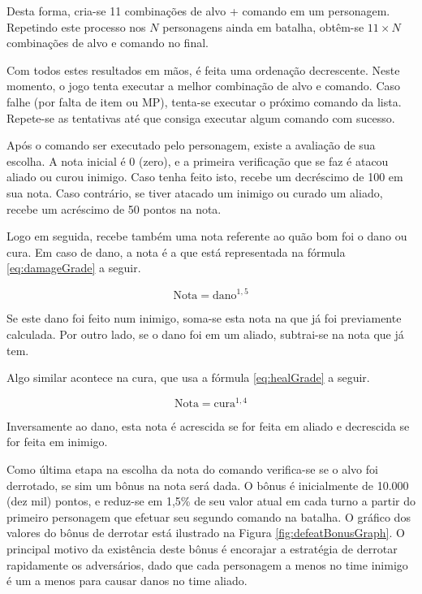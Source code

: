 \documentclass[12pt,a4paper]{article}
\begin{document}
	\vspace{3mm}
	
	Desta forma, cria-se 11 combinações de alvo + comando em um personagem.
	Repetindo este processo nos $N$ personagens ainda em batalha,
	obtêm-se $11 \times N$ combinações de alvo e comando no final.
	
	Com todos estes resultados em mãos,
	é feita uma ordenação decrescente.
	Neste momento,
	o jogo tenta executar a melhor combinação de alvo e comando.
	Caso falhe (por falta de item ou MP),
	tenta-se executar o próximo comando da lista.
	Repete-se as tentativas até que consiga executar algum comando com sucesso.
	
	Após o comando ser executado pelo personagem,
	existe a avaliação de sua escolha.
	A nota inicial é 0 (zero),
	e a primeira verificação que se faz é atacou aliado ou curou inimigo.
	Caso tenha feito isto,
	recebe um decréscimo de 100 em sua nota.
	Caso contrário,
	se tiver atacado um inimigo ou curado um aliado,
	recebe um acréscimo de 50 pontos na nota.
	
	Logo em seguida,
	recebe também uma nota referente ao quão bom foi o dano ou cura.
	Em caso de dano,
	a nota é a que está representada na fórmula \eqref{eq:damageGrade} a seguir.
	
	\begin{equation}
		\textrm{Nota} = \textrm{dano}^{1,5}
		\label{eq:damageGrade}
	\end{equation}
	
	\vspace{3mm}
	
	Se este dano foi feito num inimigo,
	soma-se esta nota na que já foi previamente calculada.
	Por outro lado,
	se o dano foi em um aliado,
	subtrai-se na nota que já tem.
	
	Algo similar acontece na cura,
	que usa a fórmula \eqref{eq:healGrade} a seguir.
	
	\begin{equation}
		\textrm{Nota} = \textrm{cura}^{1,4}
		\label{eq:healGrade}
	\end{equation}
	
	\vspace{3mm}
	
	Inversamente ao dano,
	esta nota é acrescida se for feita em aliado e decrescida se for feita em inimigo.
	
	Como última etapa na escolha da nota do comando verifica-se se o alvo foi derrotado,
	se sim um bônus na nota será dada.
	O bônus é inicialmente de 10.000 (dez mil) pontos,
	e reduz-se em 1,5\% de seu valor atual em cada turno a partir do primeiro personagem que efetuar seu segundo comando na batalha.
	O gráfico dos valores do bônus de derrotar está ilustrado na Figura \ref{fig:defeatBonusGraph}.
	O principal motivo da existência deste bônus é encorajar a estratégia de derrotar rapidamente os adversários,
	dado que cada personagem a menos no time inimigo é um a menos para causar danos no time aliado.
	
\end{document}
